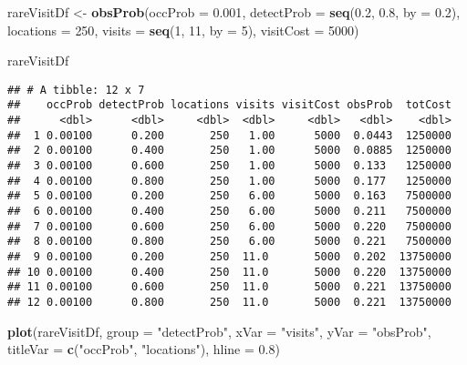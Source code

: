 \documentclass[]{article}
\newenvironment{Shaded}{\begin{snugshade}}{\end{snugshade}}
\newcommand{\KeywordTok}[1]{\textcolor[rgb]{0.13,0.29,0.53}{\textbf{#1}}}
\newcommand{\DataTypeTok}[1]{\textcolor[rgb]{0.13,0.29,0.53}{#1}}
\newcommand{\DecValTok}[1]{\textcolor[rgb]{0.00,0.00,0.81}{#1}}
\newcommand{\FloatTok}[1]{\textcolor[rgb]{0.00,0.00,0.81}{#1}}
\newcommand{\StringTok}[1]{\textcolor[rgb]{0.31,0.60,0.02}{#1}}
\newcommand{\NormalTok}[1]{#1}
\begin{document}
\begin{Shaded}
\begin{Highlighting}[]
\NormalTok{rareVisitDf <-}\StringTok{ }\KeywordTok{obsProb}\NormalTok{(}\DataTypeTok{occProb =} \FloatTok{0.001}\NormalTok{, }\DataTypeTok{detectProb =} \KeywordTok{seq}\NormalTok{(}\FloatTok{0.2}\NormalTok{, }\FloatTok{0.8}\NormalTok{, }\DataTypeTok{by =} \FloatTok{0.2}\NormalTok{), }
    \DataTypeTok{locations =} \DecValTok{250}\NormalTok{, }\DataTypeTok{visits =} \KeywordTok{seq}\NormalTok{(}\DecValTok{1}\NormalTok{, }\DecValTok{11}\NormalTok{, }\DataTypeTok{by =} \DecValTok{5}\NormalTok{), }\DataTypeTok{visitCost =} \DecValTok{5000}\NormalTok{)}

\NormalTok{rareVisitDf}
\end{Highlighting}
\end{Shaded}

\begin{verbatim}
## # A tibble: 12 x 7
##    occProb detectProb locations visits visitCost obsProb  totCost
##      <dbl>      <dbl>     <dbl>  <dbl>     <dbl>   <dbl>    <dbl>
##  1 0.00100      0.200       250   1.00      5000  0.0443  1250000
##  2 0.00100      0.400       250   1.00      5000  0.0885  1250000
##  3 0.00100      0.600       250   1.00      5000  0.133   1250000
##  4 0.00100      0.800       250   1.00      5000  0.177   1250000
##  5 0.00100      0.200       250   6.00      5000  0.163   7500000
##  6 0.00100      0.400       250   6.00      5000  0.211   7500000
##  7 0.00100      0.600       250   6.00      5000  0.220   7500000
##  8 0.00100      0.800       250   6.00      5000  0.221   7500000
##  9 0.00100      0.200       250  11.0       5000  0.202  13750000
## 10 0.00100      0.400       250  11.0       5000  0.220  13750000
## 11 0.00100      0.600       250  11.0       5000  0.221  13750000
## 12 0.00100      0.800       250  11.0       5000  0.221  13750000
\end{verbatim}

\begin{Shaded}
\begin{Highlighting}[]
\KeywordTok{plot}\NormalTok{(rareVisitDf, }\DataTypeTok{group =} \StringTok{"detectProb"}\NormalTok{, }\DataTypeTok{xVar =} \StringTok{"visits"}\NormalTok{, }\DataTypeTok{yVar =} \StringTok{"obsProb"}\NormalTok{, }\DataTypeTok{titleVar =} \KeywordTok{c}\NormalTok{(}\StringTok{"occProb"}\NormalTok{, }
    \StringTok{"locations"}\NormalTok{), }\DataTypeTok{hline =} \FloatTok{0.8}\NormalTok{)}
\end{Highlighting}
\end{Shaded}
\end{document}
